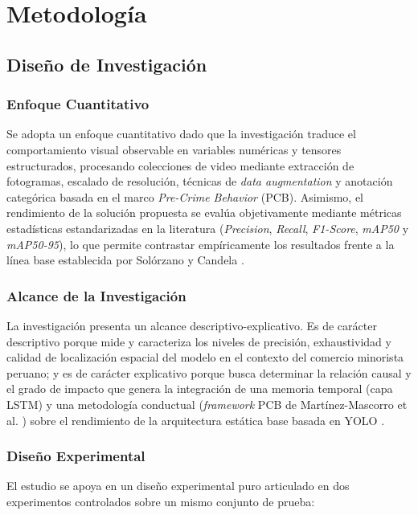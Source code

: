 \section{Metodología}

\subsection{Diseño de Investigación}

\subsubsection{Enfoque Cuantitativo}
Se adopta un enfoque cuantitativo dado que la investigación traduce el comportamiento visual observable en variables numéricas y tensores estructurados, procesando colecciones de video mediante extracción de fotogramas, escalado de resolución, técnicas de \textit{data augmentation} y anotación categórica basada en el marco \textit{Pre-Crime Behavior} (PCB). Asimismo, el rendimiento de la solución propuesta se evalúa objetivamente mediante métricas estadísticas estandarizadas en la literatura (\textit{Precision}, \textit{Recall}, \textit{F1-Score}, \textit{mAP50} y \textit{mAP50-95}), lo que permite contrastar empíricamente los resultados frente a la línea base establecida por Solórzano y Candela \cite{aguero_intelligent_2025}.

\subsubsection{Alcance de la Investigación}
La investigación presenta un alcance descriptivo-explicativo. Es de carácter descriptivo porque mide y caracteriza los niveles de precisión, exhaustividad y calidad de localización espacial del modelo en el contexto del comercio minorista peruano; y es de carácter explicativo porque busca determinar la relación causal y el grado de impacto que genera la integración de una memoria temporal (capa LSTM) y una metodología conductual (\textit{framework} PCB de Martínez-Mascorro et al. \cite{martinez-mascorro_suspicious_2021}) sobre el rendimiento de la arquitectura estática base basada en YOLO \cite{aguero_intelligent_2025}.

\subsubsection{Diseño Experimental}
El estudio se apoya en un diseño experimental puro articulado en dos experimentos controlados sobre un mismo conjunto de prueba:

